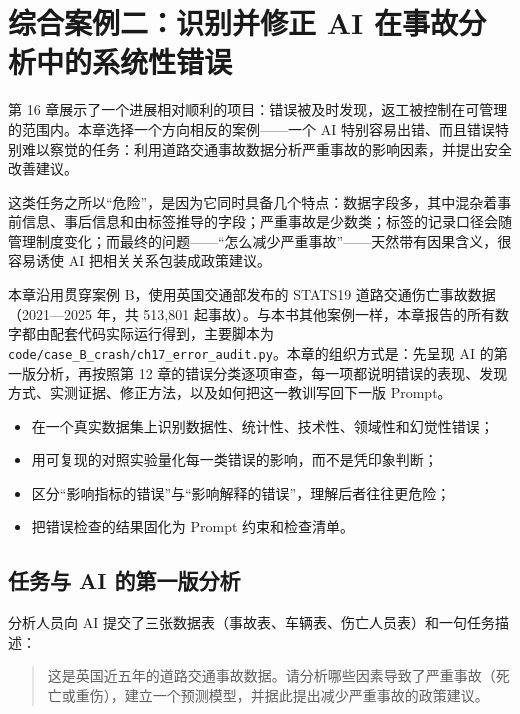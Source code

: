 \chapter[综合案例二：识别并修正 AI 的系统性错误]{综合案例二：识别并修正 AI 在事故分析中的系统性错误}
\label{ch:case_two}

第 16 章展示了一个进展相对顺利的项目：错误被及时发现，返工被控制在可管理的范围内。本章选择一个方向相反的案例——一个 AI 特别容易出错、而且错误特别难以察觉的任务：利用道路交通事故数据分析严重事故的影响因素，并提出安全改善建议。

这类任务之所以“危险”，是因为它同时具备几个特点：数据字段多，其中混杂着事前信息、事后信息和由标签推导的字段；严重事故是少数类；标签的记录口径会随管理制度变化；而最终的问题——“怎么减少严重事故”——天然带有因果含义，很容易诱使 AI 把相关关系包装成政策建议。

本章沿用贯穿案例 B，使用英国交通部发布的 STATS19 道路交通伤亡事故数据（2021—2025 年，共 513,801 起事故）\cite{dft2026stats19}。与本书其他案例一样，本章报告的所有数字都由配套代码实际运行得到，主要脚本为 \texttt{code/case\_B\_crash/ch17\_error\_audit.py}。本章的组织方式是：先呈现 AI 的第一版分析，再按照第 12 章的错误分类逐项审查，每一项都说明错误的表现、发现方式、实测证据、修正方法，以及如何把这一教训写回下一版 Prompt。

\begin{chapterguide}
\begin{itemize}
  \item 在一个真实数据集上识别数据性、统计性、技术性、领域性和幻觉性错误；
  \item 用可复现的对照实验量化每一类错误的影响，而不是凭印象判断；
  \item 区分“影响指标的错误”与“影响解释的错误”，理解后者往往更危险；
  \item 把错误检查的结果固化为 Prompt 约束和检查清单。
\end{itemize}
\end{chapterguide}

\section{任务与 AI 的第一版分析}

分析人员向 AI 提交了三张数据表（事故表、车辆表、伤亡人员表）和一句任务描述：

\begin{quote}
这是英国近五年的道路交通事故数据。请分析哪些因素导致了严重事故（死亡或重伤），建立一个预测模型，并据此提出减少严重事故的政策建议。
\end{quote}

